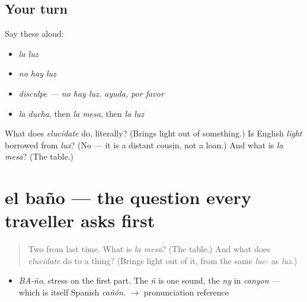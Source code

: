 \subsection*{Your turn}
Say these aloud:

\begin{itemize}
\raggedright
  \item \emph{la luz}
  \item \emph{no hay luz}
  \item \emph{disculpe — no hay luz. ayuda, por favor}
  \item \emph{la ducha}, then \emph{la mesa}, then \emph{la luz}
\end{itemize}

\begin{tcolorbox}[breakable,colback=teal!4,colframe=teal!35!black,title={Before you move on}]
What does \emph{elucidate} do, literally? (Brings light out of something.) Is English \emph{light} borrowed from \emph{lux}? (No — it is a distant cousin, not a loan.) And what is \emph{la mesa}? (The table.)
\end{tcolorbox}
\section[el baño]{el baño — the question every traveller asks first}

\label{lesson:ES-C310-bano}



\begin{quote}
Two from last time. What is \emph{la mesa}? (The table.) And what does \emph{elucidate} do to a thing? (Brings light out of it, from the same \emph{luc-} as \emph{luz}.)
\end{quote}

\begin{sounds}
\begin{itemize}
\raggedright
  \item \emph{BA-ño}, stress on the first part. The \emph{ñ} is one sound, the \emph{ny} in \emph{canyon} — which is itself Spanish \emph{cañón}. $\to$ pronunciation reference
\end{itemize}
\end{sounds}

